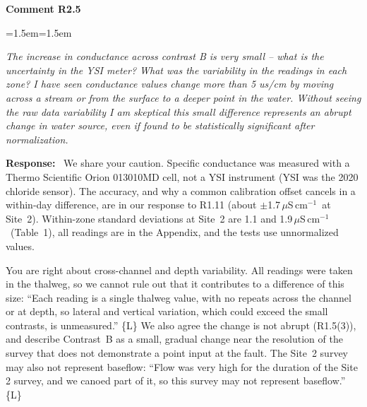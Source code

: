 \documentclass[11pt]{article}
\newcommand{\uScm}{\,$\mu$S\,cm$^{-1}$}
\newenvironment{comment}[1]
  {\par\medskip\noindent\textbf{Comment #1}\par
   \begin{list}{}{\leftmargin=1.5em\rightmargin=1.5em}\item\color{commentcolor}\itshape}
  {\end{list}}
\newenvironment{response}
  {\par\noindent\textbf{Response:}\ }
  {\par}
\newcommand{\Ln}[1]{\{L\Lref{L:#1}\}}
\newcommand{\mq}[1]{``#1''}
\begin{document}
\begin{comment}{R2.5}
The increase in conductance across contrast B is very small -- what is the uncertainty in
the YSI meter? What was the variability in the readings in each zone? I have seen
conductance values change more than 5 us/cm by moving across a stream or from the surface
to a deeper point in the water. Without seeing the raw data variability I am skeptical
this small difference represents an abrupt change in water source, even if found to be
statistically significant after normalization.
\end{comment}
\begin{response}
We share your caution. Specific conductance was measured with a Thermo Scientific Orion
013010MD cell, not a YSI instrument (YSI was the 2020 chloride sensor). The accuracy, and why a
common calibration offset cancels in a within-day difference, are in our response to R1.11
(about $\pm$1.7\uScm\ at Site~2). Within-zone standard deviations at Site~2 are 1.1 and
1.9\uScm\ (Table~1), all readings are in the Appendix, and the tests use unnormalized values.

You are right about cross-channel and depth variability. All readings were taken in the
thalweg, so we cannot rule out that it contributes to a difference of this size: \mq{Each
reading is a single thalweg value, with no repeats across the channel or at depth, so lateral
and vertical variation, which could exceed the small contrasts, is unmeasured.} \Ln{lim-thalweg}
We also agree the change is not abrupt (R1.5(3)), and describe Contrast~B as a small, gradual
change near the resolution of the survey that does not demonstrate a point input at the fault. The Site~2
survey may also not represent baseflow: \mq{Flow was very high for the duration of the Site 2 survey, and we canoed part of it, so this
survey may not represent baseflow.}
\Ln{site2-flow}
\end{response}
\end{document}
